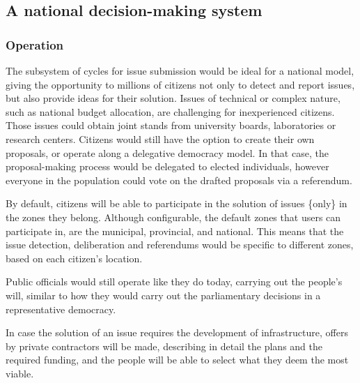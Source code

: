 \documentclass[a4paper,11pt]{article}
\begin{document}
\begin{multicols}{2}
\subsection{A national decision-making system} \label{national}


\subsubsection{Operation} \label{operationnational}

The subsystem of cycles for issue submission would be ideal for a national model, giving the opportunity to millions of citizens not only to detect and report issues, but also provide ideas for their solution. Issues of technical or complex nature, such as national budget allocation, are challenging for inexperienced citizens. Those issues could obtain joint stands from university boards, laboratories or research centers. Citizens would still have the option to create their own proposals, or operate along a delegative democracy model. In that case, the proposal-making process would be delegated to elected individuals, however everyone in the population could vote on the drafted proposals via a referendum.

By default, citizens will be able to participate in the solution of issues \{only\} in the zones they belong. Although configurable, the default zones that users can participate in, are the municipal, provincial, and national. This means that the issue detection, deliberation and referendums would be specific to different zones, based on each citizen's location.

Public officials would still operate like they do today, carrying out the people's will, similar to how they would carry out the parliamentary decisions in a representative democracy.

In case the solution of an issue requires the development of infrastructure, offers by private contractors will be made, describing in detail the plans and the required funding, and the people will be able to select what they deem the most viable.


\end{multicols}
\end{document}
